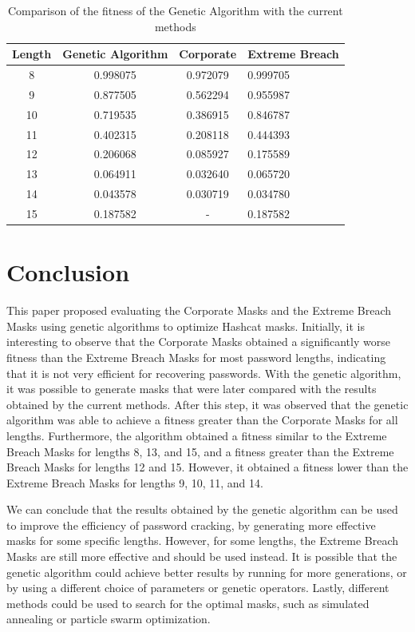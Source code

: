 \documentclass[sigconf,authordraft]{acmart}
\begin{document}
\begin{table}
  \caption{Comparison of the fitness of the Genetic Algorithm with the current methods}
  \label{tab:fitness_comparison}
  \begin{tabular}{cccl}
    \toprule
    Length & Genetic Algorithm & Corporate & Extreme Breach \\
    \midrule
    8 & 0.998075 & 0.972079 & 0.999705 \\
    9 & 0.877505 & 0.562294 & 0.955987 \\
    10 & 0.719535 & 0.386915 & 0.846787 \\
    11 & 0.402315	 & 0.208118 & 0.444393 \\
    12 & 0.206068 & 0.085927 & 0.175589 \\
    13 & 0.064911	 & 0.032640 & 0.065720 \\
    14 & 0.043578	 & 0.030719 & 0.034780 \\
    15 & 0.187582 & - & 0.187582 \\
    \bottomrule
  \end{tabular}
\end{table}

\section{Conclusion}

This paper proposed evaluating the Corporate Masks and the Extreme Breach Masks using genetic algorithms to optimize Hashcat masks.
Initially, it is interesting to observe that the Corporate Masks obtained a significantly worse fitness than the Extreme Breach Masks for most password lengths, indicating that it is not very efficient for recovering passwords.
With the genetic algorithm, it was possible to generate masks that were later compared with the results obtained by the current methods.
After this step, it was observed that the genetic algorithm was able to achieve a fitness greater than the Corporate Masks for all lengths.
Furthermore, the algorithm obtained a fitness similar to the Extreme Breach Masks for lengths 8, 13, and 15, and a fitness greater than the Extreme Breach Masks for lengths 12 and 15.
However, it obtained a fitness lower than the Extreme Breach Masks for lengths 9, 10, 11, and 14.

We can conclude that the results obtained by the genetic algorithm can be used to improve the efficiency of password cracking, by generating more effective masks for some specific lengths.
However, for some lengths, the Extreme Breach Masks are still more effective and should be used instead.
It is possible that the genetic algorithm could achieve better results by running for more generations, or by using a different choice of parameters or genetic operators.
Lastly, different methods could be used to search for the optimal masks, such as simulated annealing or particle swarm optimization.
\end{document}

